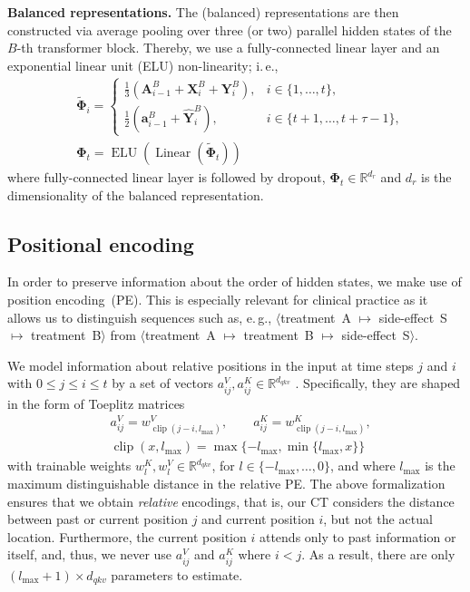 \documentclass{article}
\newcommand\ie{i.\,e.\xspace}
\newcommand\eg{e.\,g.\xspace}
\theoremstyle{plain}
\theoremstyle{definition}
\theoremstyle{remark}
\newcommand{\shortname}{CT\xspace}
\begin{document}
\textbf{Balanced representations.} The (balanced) representations are then constructed via average pooling over three (or two) parallel hidden states of the $B$-th transformer block. Thereby, we use a fully-connected linear layer and an exponential linear unit (ELU) non-linearity; \ie,
\begin{align}
\nonumber
    & \mathbf{\tilde{\Phi}}_i = 
    \begin{cases}
        \frac{1}{3}(\mathbf{A}_{i-1}^{B} + \mathbf{X}_i^{B} + \mathbf{Y}_i^{B}), & i \in \{1, \dots, t\} , \\
        \frac{1}{2}(\mathbf{a}_{i-1}^{B} + \hat{\mathbf{Y}}_i^{B}), & i \in \{t+1, \dots, t + \tau - 1\} ,
    \end{cases}  \\
    & \mathbf{\Phi}_t = \operatorname{ELU}(\operatorname{Linear}(\mathbf{\tilde{\Phi}}_t)) \label{eq:output-repr}
\end{align}
where fully-connected linear layer is followed by dropout, $\mathbf{\Phi}_t \in \mathbb{R}^{d_r}$ and $d_r$ is the dimensionality of the balanced representation.  

\subsection{Positional encoding} 

In order to preserve information about the order of hidden states, we make use of position encoding~(PE). This is especially relevant for clinical practice as it allows us to distinguish sequences such as, \eg, $\langle$treatment~A $\mapsto$ side-effect~S $\mapsto$ treatment~B$\rangle$ from $\langle$treatment~A $\mapsto$ treatment~B $\mapsto$ side-effect~S$\rangle$. 

We model information about relative positions in the input at time steps $j$  and $i$ with $0 \le j \le i \le t$ by a set of vectors $a^V_{ij}, a^K_{ij} \in \mathbb{R}^{d_{qkv}}$ \cite{shaw2018self}. Specifically, they are shaped in the form of Toeplitz matrices
\begin{align}
   & a^V_{ij} = w^V_{\operatorname{clip}(j-i, l_{\text{max}})}, \qquad a^K_{ij} = w^K_{\operatorname{clip}(j-i, l_{\text{max}})}, \\
   & \operatorname{clip}(x, l_{\text{max}}) = \max\{ -l_{\text{max}}, \min\{ l_{\text{max}}, x \}\}
\end{align}
with trainable weights $w^K_l, w^V_l \in \mathbb{R}^{d_{qkv}}$, for $l \in \{-l_{\text{max}}, \dots, 0\}$, and where $l_{\text{max}}$ is the maximum distinguishable distance in the relative PE. The above formalization ensures that we obtain \emph{relative} encodings, that is, our \shortname considers the distance between past or current position $j$ and current position $i$, but not the actual location. Furthermore, the current position $i$ attends only to past information or itself, and, thus, we never use $a^V_{ij}$ and $a^K_{ij}$ where $i < j$. As a result, there are only $(l_{\text{max}} + 1) \times d_{qkv}$ parameters to estimate.
\end{document}
